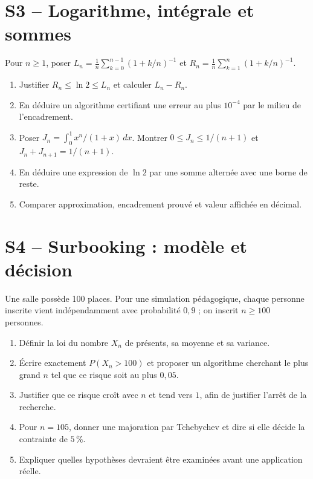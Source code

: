 \section{S3 -- Logarithme, intégrale et sommes}
Pour $n\ge1$, poser $L_n=\frac1n\sum_{k=0}^{n-1}(1+k/n)^{-1}$ et $R_n=\frac1n\sum_{k=1}^{n}(1+k/n)^{-1}$.
\begin{enumerate}
\item Justifier $R_n\le\ln2\le L_n$ et calculer $L_n-R_n$.
\item En déduire un algorithme certifiant une erreur au plus $10^{-4}$ par le milieu de l'encadrement.
\item Poser $J_n=\int_0^1x^n/(1+x)\,dx$. Montrer $0\le J_n\le1/(n+1)$ et $J_n+J_{n+1}=1/(n+1)$.
\item En déduire une expression de $\ln2$ par une somme alternée avec une borne de reste.
\item Comparer approximation, encadrement prouvé et valeur affichée en décimal.
\end{enumerate}

\section{S4 -- Surbooking : modèle et décision}
Une salle possède 100 places. Pour une simulation pédagogique, chaque personne inscrite vient indépendamment avec probabilité $0{,}9$ ; on inscrit $n\ge100$ personnes.
\begin{enumerate}
\item Définir la loi du nombre $X_n$ de présents, sa moyenne et sa variance.
\item Écrire exactement $P(X_n>100)$ et proposer un algorithme cherchant le plus grand $n$ tel que ce risque soit au plus $0{,}05$.
\item Justifier que ce risque croît avec $n$ et tend vers $1$, afin de justifier l'arrêt de la recherche.
\item Pour $n=105$, donner une majoration par Tchebychev et dire si elle décide la contrainte de $5\,\%$.
\item Expliquer quelles hypothèses devraient être examinées avant une application réelle.
\end{enumerate}

